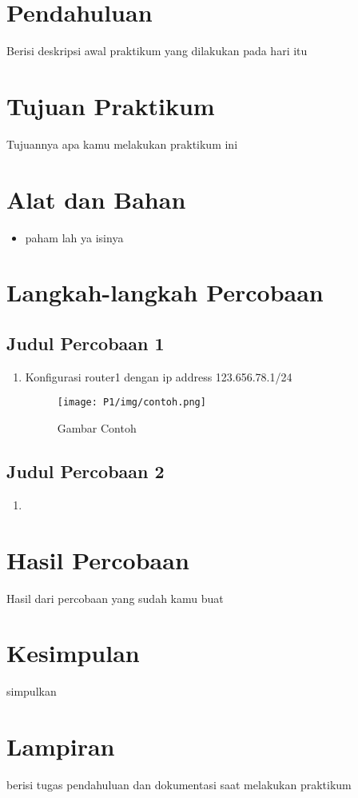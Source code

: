 \section{Pendahuluan}
Berisi deskripsi awal praktikum yang dilakukan pada hari itu
\section{Tujuan Praktikum}
Tujuannya apa kamu melakukan praktikum ini
\section{Alat dan Bahan}
\begin{itemize}[label=$\bullet$, itemsep=-1pt, leftmargin=*]
	\item paham lah ya isinya
\end{itemize}
\section{Langkah-langkah Percobaan}

\subsection{Judul Percobaan 1}
\begin{enumerate}
	\item Konfigurasi router1 dengan ip address 123.656.78.1/24
	\begin{figure}[H]
		\centering
		\texttt{[image: P1/img/contoh.png]}
		\caption{Gambar Contoh}
		\label{fig:gambar1}
	\end{figure}
\end{enumerate}

\subsection{Judul Percobaan 2}
\begin{enumerate}
	\item 
\end{enumerate}
\section{Hasil Percobaan}
Hasil dari percobaan yang sudah kamu buat
\section{Kesimpulan}
simpulkan
\section{Lampiran}
berisi tugas pendahuluan dan dokumentasi saat melakukan praktikum